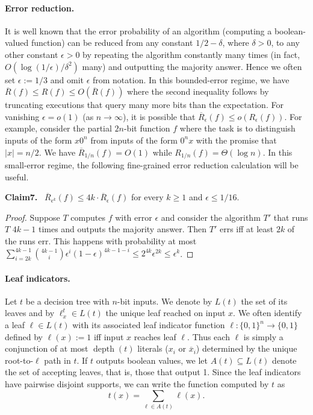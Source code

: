 \documentclass[10pt,a4paper]{article}
\newenvironment{authorclaim}[1]{\par\medskip\noindent\textbf{#1.}\ }{\par\medskip}
\begin{document}
\paragraph{Error reduction.} It is well known that the error probability of an algorithm (computing a boolean-valued function) can be reduced from any constant $1/2-\delta$, where $\delta>0$, to any other constant $\epsilon>0$ by repeating the algorithm constantly many times (in fact, $O(\log(1/\epsilon)/\delta^2)$ many) and outputting the majority answer. Hence we often set $\epsilon:=1/3$ and omit $\epsilon$ from notation. In this bounded-error regime, we have $\overline R(f)\le R(f)\le O(\overline R(f))$ where the second inequality follows by truncating executions that query many more bits than the expectation. For vanishing $\epsilon=o(1)$ (as $n\to\infty$), it is possible that $\overline R_\epsilon(f)\le o(R_\epsilon(f))$. For example, consider the partial $2n$-bit function $f$ where the task is to distinguish inputs of the form $x0^n$ from inputs of the form $0^nx$ with the promise that $|x|=n/2$. We have $\overline R_{1/n}(f)=O(1)$ while $R_{1/n}(f)=\Theta(\log n)$. In this small-error regime, the following fine-grained error reduction calculation will be useful.
\begin{authorclaim}{Claim7}
$\overline R_{\epsilon^k}(f)\le4k\cdot\overline R_\epsilon(f)$ for every $k\ge1$ and $\epsilon\le1/16$.
\end{authorclaim}
\begin{proof}
Suppose $T$ computes $f$ with error $\epsilon$ and consider the algorithm $T'$ that runs $T$ $4k-1$ times and outputs the majority answer. Then $T'$ errs iff at least $2k$ of the runs err. This happens with probability at most $\sum_{i=2k}^{4k-1}\binom{4k-1}i\epsilon^i(1-\epsilon)^{4k-1-i}\le2^{4k}\epsilon^{2k}\le\epsilon^k$.
\end{proof}
\paragraph{Leaf indicators.} Let $t$ be a decision tree with $n$-bit inputs. We denote by $L(t)$ the set of its leaves and by $\ell_x^t\in L(t)$ the unique leaf reached on input $x$. We often identify a leaf $\ell\in L(t)$ with its associated leaf indicator function $\ell:\{0,1\}^n\to\{0,1\}$ defined by $\ell(x):=1$ iff input $x$ reaches leaf $\ell$. Thus each $\ell$ is simply a conjunction of at most $\operatorname{depth}(t)$ literals ($x_i$ or $\overline x_i$) determined by the unique root-to-$\ell$ path in $t$. If $t$ outputs boolean values, we let $A(t)\subseteq L(t)$ denote the set of accepting leaves, that is, those that output 1. Since the leaf indicators have pairwise disjoint supports, we can write the function computed by $t$ as
\begin{equation}\tag{1}t(x)=\sum_{\ell\in A(t)}\ell(x).\end{equation}
\end{document}
